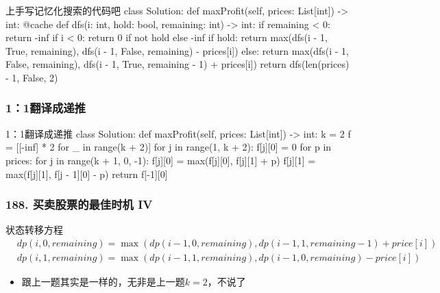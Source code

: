 \begin{frame}[fragile]
  \begin{codeblock}[language=python]{上手写记忆化搜索的代码吧}
class Solution:
    def maxProfit(self, prices: List[int]) -> int:
        @cache
        def dfs(i: int, hold: bool, remaining: int) -> int:
            if remaining < 0:
                return -inf
            if i < 0:
                return 0 if not hold else -inf
            if hold:
                return max(dfs(i - 1, True, remaining), dfs(i - 1, False, remaining) - prices[i])
            else:
                return max(dfs(i - 1, False, remaining), dfs(i - 1, True, remaining - 1) + prices[i])
        return dfs(len(prices) - 1, False, 2)
  \end{codeblock}
\end{frame}

\begin{frame}[fragile]
  \frametitle{1：1翻译成递推}
  \begin{codeblock}[language=python]{1：1翻译成递推}
class Solution:
    def maxProfit(self, prices: List[int]) -> int:
        k = 2
        f = [[-inf] * 2 for _ in range(k + 2)]
        for j in range(1, k + 2):
            f[j][0] = 0
        for p in prices:
            for j in range(k + 1, 0, -1):
                f[j][0] = max(f[j][0], f[j][1] + p)
                f[j][1] = max(f[j][1], f[j - 1][0] - p)
        return f[-1][0]
  \end{codeblock}
\end{frame}


\begin{frame}[fragile]          %
  \frametitle{\textsc{188. 买卖股票的最佳时机 IV}}
    \begin{alertblock}{状态转移方程}
    \begin{align}
      &dp(i,0,remaining)=\max(dp(i-1,0,remaining),dp(i-1,1,remaining-1)+price[i])\\
      &dp(i,1,remaining)=\max(dp(i-1,1,remaining),dp(i-1,0,remaining)-price[i])
    \end{align}
  \end{alertblock}
  \begin{itemize}
    \item 跟上一题其实是一样的，无非是上一题$k=2$，不说了
  \end{itemize}
\end{frame}


